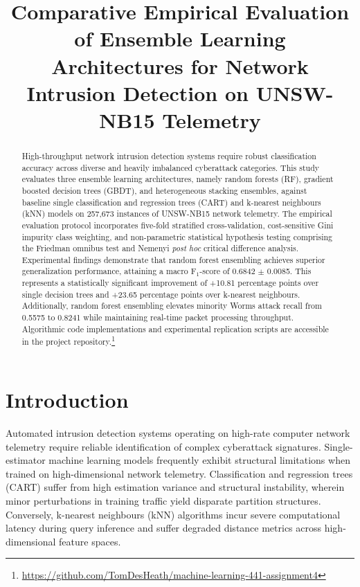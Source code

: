 \documentclass[10pt,conference,compsoc]{IEEEtran}
\begin{document}
\title{Comparative Empirical Evaluation of Ensemble Learning Architectures for Network Intrusion Detection on UNSW-NB15 Telemetry}

\author{
}

\maketitle

\begin{abstract}
High-throughput network intrusion detection systems require robust classification accuracy across diverse and heavily imbalanced cyberattack categories. This study evaluates three ensemble learning architectures, namely random forests (RF), gradient boosted decision trees (GBDT), and heterogeneous stacking ensembles, against baseline single classification and regression trees (CART) and k-nearest neighbours (kNN) models on 257,673 instances of UNSW-NB15 network telemetry. The empirical evaluation protocol incorporates five-fold stratified cross-validation, cost-sensitive Gini impurity class weighting, and non-parametric statistical hypothesis testing comprising the Friedman omnibus test and Nemenyi \textit{post hoc} critical difference analysis. Experimental findings demonstrate that random forest ensembling achieves superior generalization performance, attaining a macro $\text{F}_1$-score of 0.6842 $\pm$ 0.0085. This represents a statistically significant improvement of +10.81 percentage points over single decision trees and +23.65 percentage points over k-nearest neighbours. Additionally, random forest ensembling elevates minority Worms attack recall from 0.5575 to 0.8241 while maintaining real-time packet processing throughput. Algorithmic code implementations and experimental replication scripts are accessible in the project repository.\footnote{\url{https://github.com/TomDesHeath/machine-learning-441-assignment4}}
\end{abstract}

\section{Introduction}

Automated intrusion detection systems operating on high-rate computer network telemetry require reliable identification of complex cyberattack signatures. Single-estimator machine learning models frequently exhibit structural limitations when trained on high-dimensional network telemetry. Classification and regression trees (CART) suffer from high estimation variance and structural instability, wherein minor perturbations in training traffic yield disparate partition structures. Conversely, k-nearest neighbours (kNN) algorithms incur severe computational latency during query inference and suffer degraded distance metrics across high-dimensional feature spaces.
\end{document}
